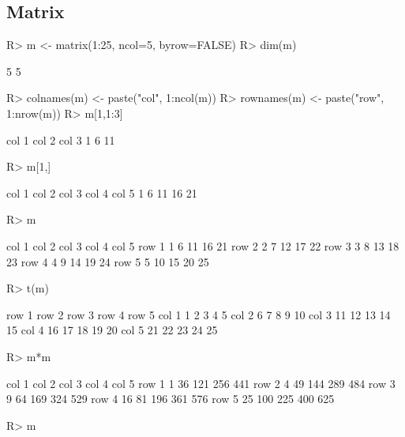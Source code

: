 \documentclass[fleqn, letter, 10pt]{article}
\begin{document}
\subsection{Matrix}

\begin{Schunk}
\begin{Sinput}
R> m <- matrix(1:25, ncol=5, byrow=FALSE)
R> dim(m)
\end{Sinput}
\begin{Soutput}
[1] 5 5
\end{Soutput}
\begin{Sinput}
R> colnames(m) <- paste("col", 1:ncol(m))
R> rownames(m) <- paste("row", 1:nrow(m))
R> m[1,1:3]
\end{Sinput}
\begin{Soutput}
col 1 col 2 col 3 
    1     6    11 
\end{Soutput}
\begin{Sinput}
R> m[1,]
\end{Sinput}
\begin{Soutput}
col 1 col 2 col 3 col 4 col 5 
    1     6    11    16    21 
\end{Soutput}
\begin{Sinput}
R> m
\end{Sinput}
\begin{Soutput}
      col 1 col 2 col 3 col 4 col 5
row 1     1     6    11    16    21
row 2     2     7    12    17    22
row 3     3     8    13    18    23
row 4     4     9    14    19    24
row 5     5    10    15    20    25
\end{Soutput}
\begin{Sinput}
R> t(m)
\end{Sinput}
\begin{Soutput}
      row 1 row 2 row 3 row 4 row 5
col 1     1     2     3     4     5
col 2     6     7     8     9    10
col 3    11    12    13    14    15
col 4    16    17    18    19    20
col 5    21    22    23    24    25
\end{Soutput}
\begin{Sinput}
R> m*m
\end{Sinput}
\begin{Soutput}
      col 1 col 2 col 3 col 4 col 5
row 1     1    36   121   256   441
row 2     4    49   144   289   484
row 3     9    64   169   324   529
row 4    16    81   196   361   576
row 5    25   100   225   400   625
\end{Soutput}
\begin{Sinput}
R> m%*%m
\end{Sinput}

\end{Schunk}
\end{document}
